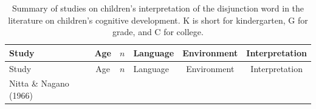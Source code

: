 \documentclass[oneside]{report}
\theoremstyle{definition}
\theoremstyle{definition}
\theoremstyle{definition}
\theoremstyle{remark}
\begin{document}
\begin{longtable}[]{@{}lcclcc@{}}
\caption{\label{tab:piagetable} Summary of studies on children's
interpretation of the disjunction word in the literature on children's
cognitive development. K is short for kindergarten, G for grade, and C
for college.}\tabularnewline
\toprule
\begin{minipage}[b]{0.17\columnwidth}\raggedright\strut
Study\strut
\end{minipage} & \begin{minipage}[b]{0.09\columnwidth}\centering\strut
Age\strut
\end{minipage} & \begin{minipage}[b]{0.09\columnwidth}\centering\strut
\(n\)\strut
\end{minipage} & \begin{minipage}[b]{0.06\columnwidth}\raggedright\strut
Language\strut
\end{minipage} & \begin{minipage}[b]{0.31\columnwidth}\centering\strut
Environment\strut
\end{minipage} & \begin{minipage}[b]{0.12\columnwidth}\centering\strut
Interpretation\strut
\end{minipage}\tabularnewline
\midrule
\endfirsthead
\toprule
\begin{minipage}[b]{0.17\columnwidth}\raggedright\strut
Study\strut
\end{minipage} & \begin{minipage}[b]{0.09\columnwidth}\centering\strut
Age\strut
\end{minipage} & \begin{minipage}[b]{0.09\columnwidth}\centering\strut
\(n\)\strut
\end{minipage} & \begin{minipage}[b]{0.06\columnwidth}\raggedright\strut
Language\strut
\end{minipage} & \begin{minipage}[b]{0.31\columnwidth}\centering\strut
Environment\strut
\end{minipage} & \begin{minipage}[b]{0.12\columnwidth}\centering\strut
Interpretation\strut
\end{minipage}\tabularnewline
\midrule
\endhead
\begin{minipage}[t]{0.17\columnwidth}\raggedright\strut
Nitta \& Nagano (1966)\strut
\end{minipage} & \begin{minipage}[t]{0.09\columnwidth}\centering\strut

\end{minipage}
\end{longtable}
\end{document}
